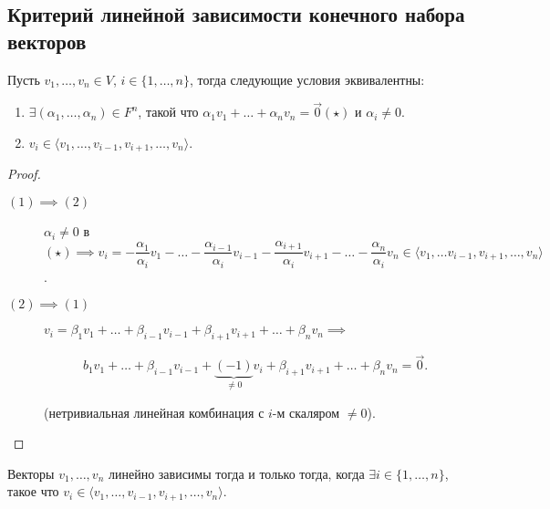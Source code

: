 \subsection{Критерий линейной зависимости конечного набора векторов}

\begin{proposal}
    Пусть $v_1, \dots, v_n \in V$, $i \in \{1, \dots, n\}$, тогда следующие условия эквивалентны:
    \begin{enumerate}
        \item $\exists (\alpha_1, \dots, \alpha_n) \in F^n$, такой что $\alpha_1 v_1 + \dots + \alpha_n v_n = \overrightarrow{0} (\star) $ и $\alpha_i \neq 0$. 
        \item $v_i \in \langle v_1, \dots, v_{i - 1}, v_{i + 1}, \dots, v_n \rangle$.
    \end{enumerate}
\end{proposal}

\begin{proof}~
    \begin{description}
        \item[$(1) \implies (2)$] $\alpha_i \neq 0$ в $(\star) \implies v_i = -\dfrac{\alpha_1}{\alpha_i} v_1 - \dots - \dfrac{\alpha_{i - 1}}{\alpha_i} v_{i - 1} - \dfrac{\alpha_{i + 1}}{\alpha_i} v_{i + 1} - \dots - \dfrac{\alpha_n}{\alpha_i} v_n \in \langle v_1, \dots v_{i - 1}, v_{i + 1}, \dots, v_n \rangle$.
        \item[$(2) \implies (1)$] 
            $v_i = \beta_1 v_1 + \dots + \beta_{i - 1} v_{i - 1} + \beta_{i + 1} v_{i + 1} + \dots + \beta_n v_n \implies $
            
            \begin{equation*}
                b_1 v_1 + \dots + \beta_{i - 1} v_{i - 1} + \underbrace{(-1)}_{\neq 0} v_i + \beta_{i + 1} v_{i + 1} + \dots + \beta_n v_n = \overrightarrow{0}
            .\end{equation*}

            (нетривиальная линейная комбинация с $i$-м скаляром $\neq 0$). \qedhere
    \end{description}
\end{proof}

\begin{corollary}
    Векторы $v_1, \dots, v_n$ линейно зависимы тогда и только тогда, когда $\exists i \in \{1, \dots, n\}$, такое что $v_i \in \langle v_1, \dots, v_{i - 1}, v_{i + 1}, \dots, v_n \rangle$.
\end{corollary}


